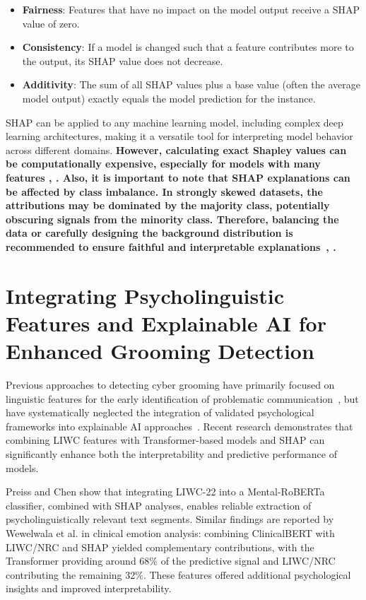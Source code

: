 \begin{itemize}
    \item \textbf{Fairness}: Features that have no impact on the model output receive a SHAP value of zero.
    \item \textbf{Consistency}: If a model is changed such that a feature contributes more to the output, its SHAP value does not decrease.
    \item \textbf{Additivity}: The sum of all SHAP values plus a base value (often the average model output) exactly equals the model prediction for the instance.

\end{itemize}
SHAP can be applied to any machine learning model, including complex deep learning architectures, making it a versatile tool for interpreting model behavior across different domains. \textbf{However, calculating exact Shapley values can be computationally expensive, especially for models with many features \cite{rozemberczki2022shapley}, \cite{aas2021explaining}. Also, it is important to note that SHAP explanations can be affected by class imbalance. In strongly skewed datasets, the attributions may be dominated by the majority class, potentially obscuring signals from the minority class. Therefore, balancing the data or carefully designing the background distribution is recommended to ensure faithful and interpretable explanations~\cite{liu2022balancedbackgroundexplanationdata}, \cite{chen2024interpretable}.
}
 

\section{Integrating Psycholinguistic Features and Explainable AI for Enhanced Grooming Detection}
Previous approaches to detecting cyber grooming have primarily focused on linguistic features for the early identification of problematic communication~\cite{yakut-kilic-pan-2022-incorporating}, but have systematically neglected the integration of validated psychological frameworks into explainable AI approaches~\cite{broome2020psycholinguistic}. Recent research demonstrates that combining LIWC features with Transformer-based models and SHAP can significantly enhance both the interpretability and predictive performance of models.

Preiss and Chen \cite{preiss-chen-2024-incorporating} show that integrating LIWC-22 into a Mental-RoBERTa classifier, combined with SHAP analyses, enables reliable extraction of psycholinguistically relevant text segments. Similar findings are reported by Wewelwala et al. \cite{wewelwala2025hybrid} in clinical emotion analysis: combining ClinicalBERT with LIWC/NRC and SHAP yielded complementary contributions, with the Transformer providing around 68\% of the predictive signal and LIWC/NRC contributing the remaining 32\%. These features offered additional psychological insights and improved interpretability.

